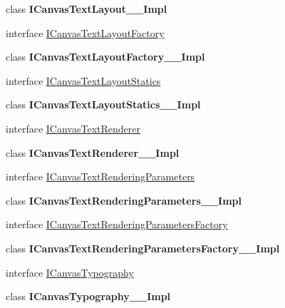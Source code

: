 \begin{DoxyCompactItemize}
\item 
class {\bfseries I\+Canvas\+Text\+Layout\+\_\+\+\_\+\+Impl}
\item 
interface \hyperlink{interface_microsoft_1_1_graphics_1_1_canvas_1_1_text_1_1_i_canvas_text_layout_factory}{I\+Canvas\+Text\+Layout\+Factory}
\item 
class {\bfseries I\+Canvas\+Text\+Layout\+Factory\+\_\+\+\_\+\+Impl}
\item 
interface \hyperlink{interface_microsoft_1_1_graphics_1_1_canvas_1_1_text_1_1_i_canvas_text_layout_statics}{I\+Canvas\+Text\+Layout\+Statics}
\item 
class {\bfseries I\+Canvas\+Text\+Layout\+Statics\+\_\+\+\_\+\+Impl}
\item 
interface \hyperlink{interface_microsoft_1_1_graphics_1_1_canvas_1_1_text_1_1_i_canvas_text_renderer}{I\+Canvas\+Text\+Renderer}
\item 
class {\bfseries I\+Canvas\+Text\+Renderer\+\_\+\+\_\+\+Impl}
\item 
interface \hyperlink{interface_microsoft_1_1_graphics_1_1_canvas_1_1_text_1_1_i_canvas_text_rendering_parameters}{I\+Canvas\+Text\+Rendering\+Parameters}
\item 
class {\bfseries I\+Canvas\+Text\+Rendering\+Parameters\+\_\+\+\_\+\+Impl}
\item 
interface \hyperlink{interface_microsoft_1_1_graphics_1_1_canvas_1_1_text_1_1_i_canvas_text_rendering_parameters_factory}{I\+Canvas\+Text\+Rendering\+Parameters\+Factory}
\item 
class {\bfseries I\+Canvas\+Text\+Rendering\+Parameters\+Factory\+\_\+\+\_\+\+Impl}
\item 
interface \hyperlink{interface_microsoft_1_1_graphics_1_1_canvas_1_1_text_1_1_i_canvas_typography}{I\+Canvas\+Typography}
\item 
class {\bfseries I\+Canvas\+Typography\+\_\+\+\_\+\+Impl}
\end{DoxyCompactItemize}
